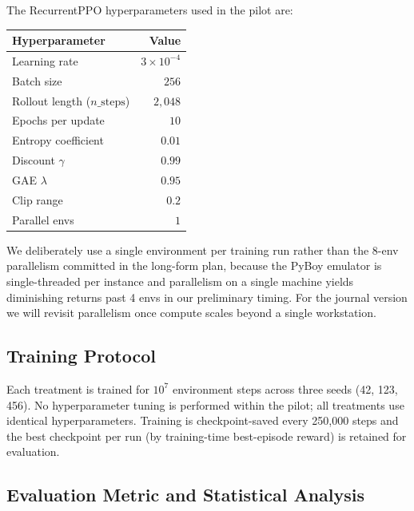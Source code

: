 The RecurrentPPO hyperparameters used in the pilot are:
%
\begin{table}[h]
\centering
\small
\begin{tabular}{lr}
\toprule
Hyperparameter & Value \\
\midrule
Learning rate & $3 \times 10^{-4}$ \\
Batch size    & $256$ \\
Rollout length ($n\_\text{steps}$) & $2{,}048$ \\
Epochs per update & $10$ \\
Entropy coefficient & $0.01$ \\
Discount $\gamma$ & $0.99$ \\
GAE $\lambda$ & $0.95$ \\
Clip range & $0.2$ \\
Parallel envs & $1$ \\
\bottomrule
\end{tabular}
\end{table}
%
We deliberately use a single environment per training run rather than
the 8-env parallelism committed in the long-form plan, because the
PyBoy emulator is single-threaded per instance and parallelism on a
single machine yields diminishing returns past 4 envs in our
preliminary timing.  For the journal version we will revisit
parallelism once compute scales beyond a single workstation.

\subsection{Training Protocol}
\label{sec:protocol}

Each treatment is trained for $10^7$ environment steps across three
seeds (42, 123, 456).  No hyperparameter tuning is performed within
the pilot; all treatments use identical hyperparameters.  Training is
checkpoint-saved every 250{,}000 steps and the best checkpoint per run
(by training-time best-episode reward) is retained for evaluation.

\subsection{Evaluation Metric and Statistical Analysis}
\label{sec:stats}

